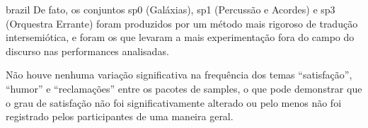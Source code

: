 \begin{otherlanguage*}{brazil}
De fato, os conjuntos sp0 (Galáxias), sp1 (Percussão e Acordes) e sp3 (Orquestra Errante) foram produzidos por um método mais rigoroso de tradução intersemiótica, e foram os que levaram a mais experimentação fora do campo do discurso nas performances analisadas. 



Não houve nenhuma variação significativa na frequência dos temas ``satisfação'', ``humor'' e ``reclamações'' entre os pacotes de samples, o que pode demonstrar que o grau de satisfação não foi significativamente alterado ou pelo menos não foi registrado pelos participantes de uma maneira geral. 


\end{otherlanguage*}
